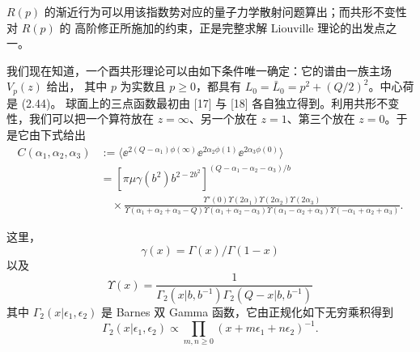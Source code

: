 
$R(p)$ 的渐近行为可以用该指数势对应的量子力学散射问题算出；而共形不变性对 $R(p)$ 的
高阶修正所施加的约束，正是完整求解 Liouville 理论的出发点之一。

我们现在知道，一个酉共形理论可以由如下条件唯一确定：它的谱由一族主场 $V_p(z)$ 给出，
其中 $p$ 为实数且 $p\ge 0$，都具有 $L_0=\bar L_0=p^2+(Q/2)^2$。中心荷是 (2.44)。
球面上的三点函数最初由 [17] 与 [18] 各自独立得到。利用共形不变性，我们可以把一个算符放在
$z=\infty$、另一个放在 $z=1$、第三个放在 $z=0$。于是它由下式给出
\begin{equation}
  \begin{aligned}
    C(\alpha_1,\alpha_2,\alpha_3) &:= \langle \ee^{2(Q-\alpha_1)\phi(\infty)}
      \ee^{2\alpha_2\phi(1)}\ee^{2\alpha_3\phi(0)}\rangle \\
    &= \left[\pi\mu\gamma(b^2)b^{2-2b^2}\right]^{(Q-\alpha_1-\alpha_2-\alpha_3)/b} \\
    &\quad \times \frac{\Upsilon'(0)\Upsilon(2\alpha_1)\Upsilon(2\alpha_2)\Upsilon(2\alpha_3)}
      {\Upsilon(\alpha_1+\alpha_2+\alpha_3-Q)\Upsilon(\alpha_1+\alpha_2-\alpha_3)
       \Upsilon(\alpha_1-\alpha_2+\alpha_3)\Upsilon(-\alpha_1+\alpha_2+\alpha_3)}.
  \end{aligned}
  \tag{2.46}
\end{equation}


这里，
\begin{equation}
  \gamma(x) = \Gamma(x)/\Gamma(1-x)
  \tag{2.47}
\end{equation}
以及
\begin{equation}
  \Upsilon(x) = \frac{1}{\Gamma_2(x|b,b^{-1})\Gamma_2(Q-x|b,b^{-1})}
  \tag{2.48}
\end{equation}
其中 $\Gamma_2(x|\epsilon_1,\epsilon_2)$ 是 Barnes 双 Gamma 函数，它由正规化如下无穷乘积得到
\begin{equation}
  \Gamma_2(x|\epsilon_1,\epsilon_2) \propto \prod_{m,n\ge 0}(x+m\epsilon_1+n\epsilon_2)^{-1}.
  \tag{2.49}
\end{equation}

